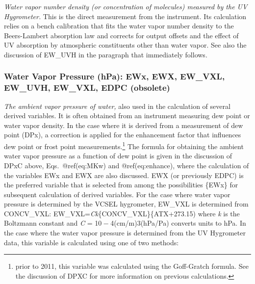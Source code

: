 \documentclass[
  english,
]{book}
\begin{document}
\emph{Water vapor number density (or concentration of molecules)
measured by the UV Hygrometer.} This is the direct measurement from the
instrument. Its calculation relies on a bench calibration that fits the
water vapor number density to the Beers-Lambert absorption law and
corrects for output offsets and the effect of UV absorption by
atmospheric constituents other than water vapor. See also the discussion
of EW\_UVH in the paragraph that immediately follows.

\hypertarget{ewx}{%
\subsubsection*{Water Vapor Pressure (hPa): EWx, EWX, EW\_VXL, EW\_UVH,
EW\_VXL, EDPC (obsolete)}\label{ewx}}

\emph{The ambient vapor pressure of water,} also used in the calculation
of several derived variables. It is often obtained from an instrument
measuring dew point or water vapor density. In the case where it is
derived from a measurement of dew point (DPx), a correction is applied
for the enhancement factor that influences dew point or frost point
measurements.\footnote{prior to 2011, this variable was calculated using
  the Goff-Gratch formula. See the discussion of DPXC for more
  information on previous calculations.} The formula for obtaining the
ambient water vapor pressure as a function of dew point is given in the
discussion of DPxC above, Eqs.~@ref(eq:MKw) and @ref(eq:enhance), where
the calculation of the variables EWx and EWX are also discussed. EWX (or
previously EDPC) is the preferred variable that is selected from among
the possibilities \{EWx\} for subsequent calculation of derived
variables. For the case where water vapor pressure is determined by the
VCSEL hygrometer, EW\_VXL is determined from CONCV\_VXL:
EW\_VXL={\emph{C}}{\emph{k}}\{CONCV\_VXL\}\{ATX+273.15) where {\emph{k}}
is the Boltzmann constant and {\emph{C} = 10 − 4}(cm/m){3}(hPa/Pa)
converts units to hPa. In the case where the water vapor pressure is
determined from the UV Hygrometer data, this variable is calculated
using one of two methods:
\end{document}
